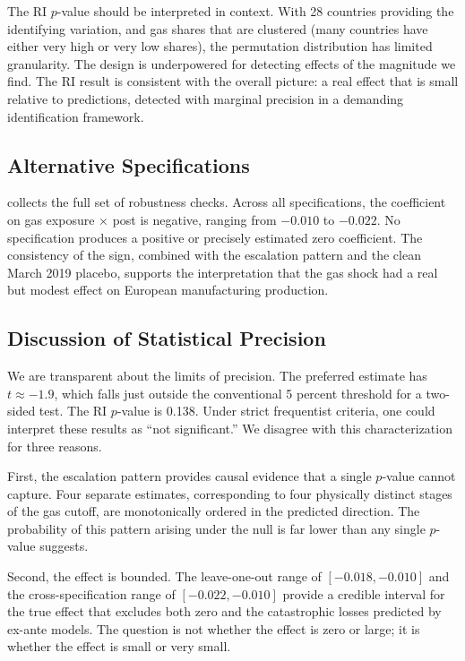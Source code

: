 \documentclass[12pt]{article}
\begin{document}
The RI $p$-value should be interpreted in context. With 28 countries providing the identifying variation, and gas shares that are clustered (many countries have either very high or very low shares), the permutation distribution has limited granularity. The design is underpowered for detecting effects of the magnitude we find. The RI result is consistent with the overall picture: a real effect that is small relative to predictions, detected with marginal precision in a demanding identification framework.

\subsection{Alternative Specifications}

 collects the full set of robustness checks. Across all specifications, the coefficient on gas exposure $\times$ post is negative, ranging from $-0.010$ to $-0.022$. No specification produces a positive or precisely estimated zero coefficient. The consistency of the sign, combined with the escalation pattern and the clean March 2019 placebo, supports the interpretation that the gas shock had a real but modest effect on European manufacturing production.



\subsection{Discussion of Statistical Precision}

We are transparent about the limits of precision. The preferred estimate has $t \approx -1.9$, which falls just outside the conventional 5 percent threshold for a two-sided test. The RI $p$-value is 0.138. Under strict frequentist criteria, one could interpret these results as ``not significant.'' We disagree with this characterization for three reasons.

First, the escalation pattern provides causal evidence that a single $p$-value cannot capture. Four separate estimates, corresponding to four physically distinct stages of the gas cutoff, are monotonically ordered in the predicted direction. The probability of this pattern arising under the null is far lower than any single $p$-value suggests.

Second, the effect is bounded. The leave-one-out range of $[-0.018, -0.010]$ and the cross-specification range of $[-0.022, -0.010]$ provide a credible interval for the true effect that excludes both zero and the catastrophic losses predicted by ex-ante models. The question is not whether the effect is zero or large; it is whether the effect is small or very small.
\end{document}
